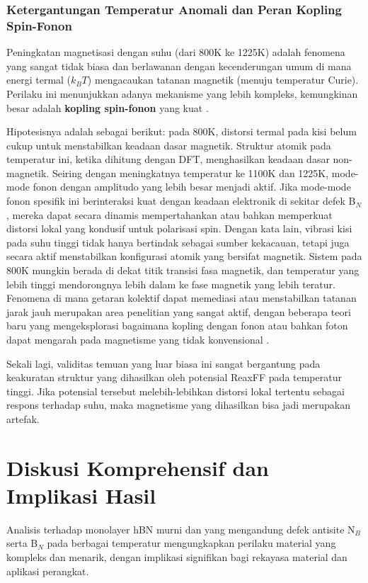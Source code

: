 \subsubsection{Ketergantungan Temperatur Anomali dan Peran Kopling Spin-Fonon}
Peningkatan magnetisasi dengan suhu (dari 800K ke 1225K) adalah fenomena yang sangat tidak biasa dan berlawanan dengan kecenderungan umum di mana energi termal ($k_B T$) mengacaukan tatanan magnetik (menuju temperatur Curie). Perilaku ini menunjukkan adanya mekanisme yang lebih kompleks, kemungkinan besar adalah \textbf{kopling spin-fonon} yang kuat \citep{Liu_2025}.

Hipotesisnya adalah sebagai berikut: pada 800K, distorsi termal pada kisi belum cukup untuk menstabilkan keadaan dasar magnetik. Struktur atomik pada temperatur ini, ketika dihitung dengan DFT, menghasilkan keadaan dasar non-magnetik. Seiring dengan meningkatnya temperatur ke 1100K dan 1225K, mode-mode fonon dengan amplitudo yang lebih besar menjadi aktif. Jika mode-mode fonon spesifik ini berinteraksi kuat dengan keadaan elektronik di sekitar defek B$_N$, mereka dapat secara dinamis mempertahankan atau bahkan memperkuat distorsi lokal yang kondusif untuk polarisasi spin. Dengan kata lain, vibrasi kisi pada suhu tinggi tidak hanya bertindak sebagai sumber kekacauan, tetapi juga secara aktif menstabilkan konfigurasi atomik yang bersifat magnetik. Sistem pada 800K mungkin berada di dekat titik transisi fasa magnetik, dan temperatur yang lebih tinggi mendorongnya lebih dalam ke fase magnetik yang lebih teratur. Fenomena di mana getaran kolektif dapat memediasi atau menstabilkan tatanan jarak jauh merupakan area penelitian yang sangat aktif, dengan beberapa teori baru yang mengeksplorasi bagaimana kopling dengan fonon atau bahkan foton dapat mengarah pada magnetisme yang tidak konvensional \citep{Pantazopoulos2024}.

Sekali lagi, validitas temuan yang luar biasa ini sangat bergantung pada keakuratan struktur yang dihasilkan oleh potensial ReaxFF pada temperatur tinggi. Jika potensial tersebut melebih-lebihkan distorsi lokal tertentu sebagai respons terhadap suhu, maka magnetisme yang dihasilkan bisa jadi merupakan artefak.

\section{Diskusi Komprehensif dan Implikasi Hasil}
\label{sec:diskusi_komprehensif}
Analisis terhadap monolayer hBN murni dan yang mengandung defek antisite N$_B$ serta B$_N$ pada berbagai temperatur mengungkapkan perilaku material yang kompleks dan menarik, dengan implikasi signifikan bagi rekayasa material dan aplikasi perangkat.

